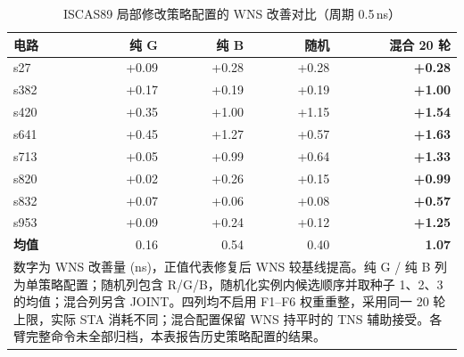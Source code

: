 \documentclass[twocolumn,10pt,fontset=windows]{ctexart}
\begin{document}
\begin{table}[H]
\centering
\caption{ISCAS89 局部修改策略配置的 WNS 改善对比（周期 0.5\,ns）}
\label{tab:ablation}
\scriptsize
\setlength{\tabcolsep}{3pt}
\begin{tabular}{lrrrr}
\toprule
\textbf{电路} & \textbf{纯 G} & \textbf{纯 B} & \textbf{随机} & \textbf{混合 20 轮} \\
\midrule
s27  & +0.09 & +0.28 & +0.28 & \textbf{+0.28} \\
s382 & +0.17 & +0.19 & +0.19 & \textbf{+1.00} \\
s420 & +0.35 & +1.00 & +1.15 & \textbf{+1.54} \\
s641 & +0.45 & +1.27 & +0.57 & \textbf{+1.63} \\
s713 & +0.05 & +0.99 & +0.64 & \textbf{+1.33} \\
s820 & +0.02 & +0.26 & +0.15 & \textbf{+0.99} \\
s832 & +0.07 & +0.06 & +0.08 & \textbf{+0.57} \\
s953 & +0.09 & +0.24 & +0.12 & \textbf{+1.25} \\
\midrule
\textbf{均值} & 0.16 & 0.54 & 0.40 & \textbf{1.07} \\
\bottomrule
\multicolumn{5}{p{0.92\columnwidth}}{\footnotesize 数字为 WNS 改善量 (ns)，正值代表修复后 WNS 较基线提高。纯 G / 纯 B 列为单策略配置；随机列包含 R/G/B，随机化实例内候选顺序并取种子 1、2、3 的均值；混合列另含 JOINT。四列均不启用 F1--F6 权重重整，采用同一 20 轮上限，实际 STA 消耗不同；混合配置保留 WNS 持平时的 TNS 辅助接受。各臂完整命令未全部归档，本表报告历史策略配置的结果。} \\
\end{tabular}
\end{table}
\end{document}

